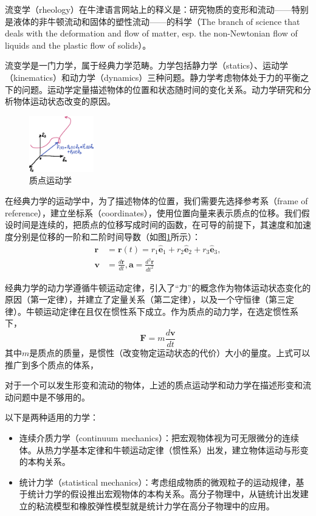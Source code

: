 \documentclass[main.tex]{subfiles}
\begin{document}
流变学（rheology）在牛津语言网站上的释义是：研究物质的变形和流动——特别是液体的非牛顿流动和固体的塑性流动——的科学（The branch of science that deals with the deformation and flow of matter, esp. the non-Newtonian flow of liquids and the plastic flow of solids）。

流变学是一门力学，属于经典力学范畴。力学包括静力学（statics）、运动学（kinematics）和动力学（dynamics）三种问题。静力学考虑物体处于力的平衡之下的问题。运动学定量描述物体的位置和状态随时间的变化关系。动力学研究和分析物体运动状态改变的原因。\cite[p.~1]{邓文基2009大物上}

\begin{figure}
    \centering
    \includegraphics[width=0.25\textwidth]{images/I.1.1.eps}
    \caption{质点运动学}
    \label{fig:I.1.1}
\end{figure}

在经典力学的运动学中，为了描述物体的位置，我们需要先选择参考系（frame of reference），建立坐标系（coordinates），使用位置向量来表示质点的位移。我们假设时间是连续的，把质点的位移写成时间的函数，在可导的前提下，其速度和加速度分别是位移的一阶和二阶时间导数\cite[附录A,p.~422]{邓文基2009大物上}（如图\ref{fig:I.1.1}所示）：
\begin{align*}
    \mathbf{r} & =\mathbf{r}\left(t\right)=r_1\mathbf{\hat{e}}_1+r_2\mathbf{\hat{e}}_2+r_3\mathbf{\hat{e}}_3, \\
    \mathbf{v} & =\frac{d\mathbf{r}}{dt},\mathbf{a}=\frac{d^2\mathbf{r}}{dt^2}
\end{align*}

经典力学的动力学遵循牛顿运动定律，引入了“力”的概念作为物体运动状态变化的原因（第一定律），并建立了定量关系（第二定律），以及一个守恒律（第三定律）。牛顿运动定律在且仅在惯性系下成立。作为质点的动力学，在选定惯性系下，
\[\mathbf{F}=m\frac{d\mathbf{v}}{dt}\]
其中$m$是质点的质量，是惯性（改变物定运动状态的代价）大小的量度。上式可以推广到多个质点的体系，

对于一个可以发生形变和流动的物体，上述的质点运动学和动力学在描述形变和流动问题中是不够用的。

以下是两种适用的力学：
\begin{itemize}
    \item 连续介质力学（continuum mechanics）：把宏观物体视为可无限微分的连续体。从热力学基本定律和牛顿运动定律（惯性系）出发，建立物体运动与形变的本构关系。
    \item 统计力学（statistical mechanics）：考虑组成物质的微观粒子的运动规律，基于统计力学的假设推出宏观物体的本构关系。高分子物理中，从链统计出发建立的粘流模型和橡胶弹性模型就是统计力学在高分子物理中的应用。
\end{itemize}
\end{document}
